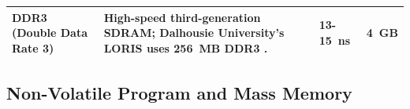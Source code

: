 \documentclass[10pt]{../datasheet}
\let\cite\citep
\begin{document}
\begin{longtable}{|p{2.8cm}|p{8.8cm}|p{2.1cm}|p{2.1cm}|}
  \textbf{DDR3} \newline (Double Data Rate 3)                                                                                                                                                                                                   &
  High-speed third-generation SDRAM; Dalhousie University’s LORIS uses 256~MB DDR3 \cite{loris_obc_pub}.                                                                                                                                        &
  13-15~ns \cite[pp. 67-70]{micron_ddr3_ds}                                                                                                                                                                                                     &
  4~GB \cite[p.1]{micron_ddr3_ds}                                                                                                                                                                                                                                                                                                                            \\ \hline
\end{longtable}

\vspace{1.5em}

\subsection*{Non-Volatile Program and Mass Memory}
\end{document}
